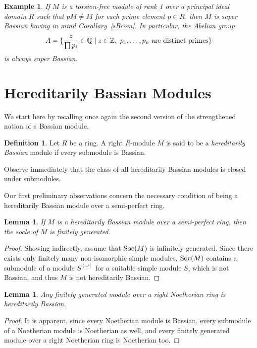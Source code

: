 \documentclass{amsart}
\newtheorem{lm}[thm]{Lemma}
\newtheorem{exm}[thm]{Example}
\theoremstyle{definition}
\newtheorem*{definition}{Definition}
\newcommand{\Z}{\mathbb{Z}}
\newcommand{\Q}{\mathbb{Q}}
\DeclareMathOperator{\Soc}{\rm Soc}
\begin{document}
\begin{exm}
If $M$ is a torsion-free module of rank 1 over a principal ideal domain $R$ such that $pM\ne M$ for each prime element $p\in R$, then $M$ is super Bassian having in mind Corollary~\ref{sBcom}. In particular, the Abelian group
\[
A=\{\frac{z}{\prod p_i}\in \Q \mid z\in \Z,\  p_1,\dots,p_n ~ {\rm are ~ distinct ~ primes}\}
\] is always super Bassian.
\end{exm}

\section{Hereditarily Bassian Modules}

We start here by recalling once again the second version of the strengthened notion of a Bassian module.

\begin{definition} Let $R$ be a ring. A right $R$-module $M$ is said to be a {\it hereditarily Bassian} module if every submodule is Bassian.
\end{definition}

Observe immediately that the class of all hereditarily Bassian modules is closed under submodules.

\medskip

Our first preliminary observations concern the necessary condition of being a hereditarily Bassian module over a semi-perfect ring.

\begin{lm}\label{semi-perfect} If $M$ is a hereditarily Bassian module over a semi-perfect ring, then the socle of $M$ is finitely generated.
\end{lm}

\begin{proof} Showing indirectly, assume that $\Soc(M)$ is infinitely generated. Since there exists only finitely many non-isomorphic simple modules, $\Soc(M)$ contains a submodule of a module $S^{(\omega)}$ for a suitable simple module $S$, which is not Bassian, and thus $M$ is not hereditarily Bassian.
\end{proof}

\begin{lm}\label{noetherian2} Any finitely generated module over a right Noetherian ring is hereditarily Bassian.
\end{lm}

\begin{proof} It is apparent, since every Noetherian module is Bassian, every submodule of a Noetherian module is Noetherian as well, and every finitely generated module over a right Noetherian ring is Noetherian too.
\end{proof}
\end{document}
